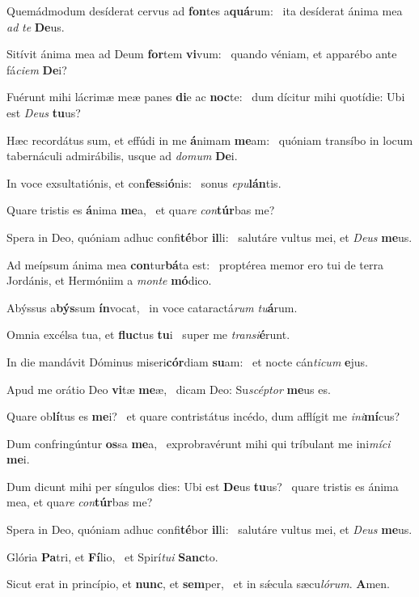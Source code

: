 \item Quemádmodum desíderat cervus ad \textbf{fon}tes a\textbf{quá}rum:~\psstar{} ita desíderat ánima mea \textit{ad} \textit{te} \textbf{De}us.
\item Sitívit ánima mea ad Deum \textbf{for}tem \textbf{vi}vum:~\psstar{} quando véniam, et apparébo ante fá\textit{ciem} \textbf{De}i?
\item Fuérunt mihi lácrimæ meæ panes \textbf{di}e ac \textbf{noc}te:~\psstar{} dum dícitur mihi quotídie: Ubi est \textit{Deus} \textbf{tu}us?
\item Hæc recordátus sum, et effúdi in me \textbf{á}nimam \textbf{me}am:~\psstar{} quóniam transíbo in locum tabernáculi admirábilis, usque ad \textit{domum} \textbf{De}i.
\item In voce exsultatiónis, et con\textbf{fes}si\textbf{ó}nis:~\psstar{} sonus \textit{epu}\textbf{lán}tis.
\item Quare tristis es \textbf{á}nima \textbf{me}a,~\psstar{} et qua\textit{re} \textit{con}\textbf{túr}bas me?
\item Spera in Deo, quóniam adhuc confi\textbf{té}bor \textbf{il}li:~\psstar{} salutáre vultus mei, et \textit{Deus} \textbf{me}us.
\item Ad meípsum ánima mea \textbf{con}tur\textbf{bá}ta est:~\psstar{} proptérea memor ero tui de terra Jordánis, et Hermóniim a \textit{monte} \textbf{mó}dico.
\item Abýssus a\textbf{býs}sum \textbf{ín}vocat,~\psstar{} in voce cataractá\textit{rum} \textit{tu}\textbf{á}rum.
\item Omnia excélsa tua, et \textbf{fluc}tus \textbf{tu}i~\psstar{} super me \textit{transi}\textbf{é}runt.
\item In die mandávit Dóminus miseri\textbf{cór}diam \textbf{su}am:~\psstar{} et nocte cán\textit{ticum} \textbf{e}jus.
\item Apud me orátio Deo \textbf{vi}tæ \textbf{me}æ,~\psstar{} dicam Deo: Su\textit{scéptor} \textbf{me}us es.
\item Quare ob\textbf{lí}tus es \textbf{me}i?~\psstar{} et quare contristátus incédo, dum afflígit me \textit{ini}\textbf{mí}cus?
\item Dum confringúntur \textbf{os}sa \textbf{me}a,~\psstar{} exprobravérunt mihi qui tríbulant me ini\textit{míci} \textbf{me}i.
\item Dum dicunt mihi per síngulos dies: Ubi est \textbf{De}us \textbf{tu}us?~\psstar{} quare tristis es ánima mea, et qua\textit{re} \textit{con}\textbf{túr}bas me?
\item Spera in Deo, quóniam adhuc confi\textbf{té}bor \textbf{il}li:~\psstar{} salutáre vultus mei, et \textit{Deus} \textbf{me}us.
\item Glória \textbf{Pa}tri, et \textbf{Fí}lio,~\psstar{} et Spirí\textit{tui} \textbf{Sanc}to.
\item Sicut erat in princípio, et \textbf{nunc}, et \textbf{sem}per,~\psstar{} et in sǽcula sæcu\textit{lórum}. \textbf{A}men.